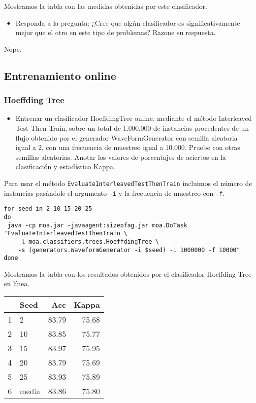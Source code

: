 \documentclass[11pt]{article}
\begin{document}
Mostramos la tabla con las medidas obtenidas por este clasificador. 

\begin{itemize}
\item Responda a la pregunta: ¿Cree que algún clasificador es
significativamente mejor que el otro en este tipo de problemas?
Razone su respuesta.
\end{itemize}

Nope. 

\subsection{Entrenamiento online}
\label{sec:org7505d75}

\subsubsection{Hoeffding Tree}
\label{sec:org69bb4cb}
\begin{itemize}
\item Entrenar un clasificador HoeffdingTree online, mediante el método
Interleaved Test-Then-Train, sobre un total de 1.000.000 de
instancias procedentes de un flujo obtenido por el generador
WaveFormGenerator con semilla aleatoria igual a 2, con una
frecuencia de muestreo igual a 10.000. Pruebe con otras semillas
aleatorias. Anotar los valores de porcentajes de aciertos en la
clasificación y estadístico Kappa.
\end{itemize}

Para usar el método \texttt{EvaluateInterleavedTestThenTrain} incluimos el
número de instancias pasándole el argumento \texttt{-i} y la frecuencia de
muestreo con \texttt{-f}.

\begin{verbatim}
for seed in 2 10 15 20 25 
do 
 java -cp moa.jar -javaagent:sizeofag.jar moa.DoTask "EvaluateInterleavedTestThenTrain \
    -l moa.classifiers.trees.HoeffdingTree \
    -s (generators.WaveformGenerator -i $seed) -i 1000000 -f 10000"
done
\end{verbatim}

Mostramos la tabla con los resultados obtenidos por el clasificador
Hoeffding Tree en línea. 

\begin{table}[ht]
\centering
\begin{tabular}{rlrr}
  \hline
 & Seed & Acc & Kappa \\ 
  \hline
1 & 2 & 83.79 & 75.68 \\ 
  2 & 10 & 83.85 & 75.77 \\ 
  3 & 15 & 83.97 & 75.95 \\ 
  4 & 20 & 83.79 & 75.69 \\ 
  5 & 25 & 83.93 & 75.89 \\ 
  6 & media & 83.86 & 75.80 \\ 
   \hline
\end{tabular}
\end{table}
\end{document}
